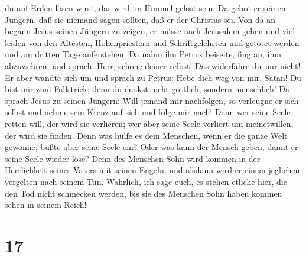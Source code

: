 du auf Erden lösen wirst, das wird im Himmel gelöst sein.
 Da gebot er seinen Jüngern, daß sie niemand sagen
sollten, daß er der Christus sei.  Von da an begann Jesus
seinen Jüngern zu zeigen, er müsse nach Jerusalem gehen und viel leiden
von den Ältesten, Hohenpriestern und Schriftgelehrten und getötet werden
und am dritten Tage auferstehen.  Da nahm ihn Petrus
beiseite, fing an, ihm abzuwehren, und sprach: Herr, schone deiner
selbst! Das widerfahre dir nur nicht!  Er aber wandte
sich um und sprach zu Petrus: Hebe dich weg von mir, Satan! Du bist mir
zum Fallstrick; denn du denkst nicht göttlich, sondern menschlich!
 Da sprach Jesus zu seinen Jüngern: Will jemand mir
nachfolgen, so verleugne er sich selbst und nehme sein Kreuz auf sich
und folge mir nach!  Denn wer seine Seele retten will,
der wird sie verlieren; wer aber seine Seele verliert um meinetwillen,
der wird sie finden.  Denn was hülfe es dem Menschen,
wenn er die ganze Welt gewönne, büßte aber seine Seele ein? Oder was
kann der Mensch geben, damit er seine Seele wieder löse? 
Denn des Menschen Sohn wird kommen in der Herrlichkeit seines Vaters mit
seinen Engeln; und alsdann wird er einem jeglichen vergelten nach seinem
Tun.  Wahrlich, ich sage euch, es stehen etliche hier,
die den Tod nicht schmecken werden, bis sie des Menschen Sohn haben
kommen sehen in seinem Reich!

\hypertarget{section-16}{%
\section{17}\label{section-16}}

